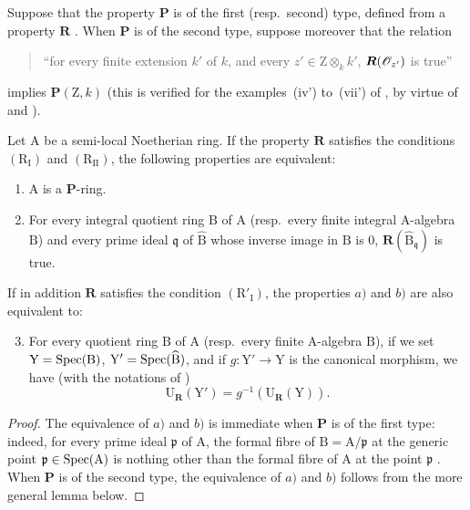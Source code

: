 \begin{proposition}[7.3.16]
\label{IV.7.3.16}
Suppose that the property $\boldsymbol{P}$ is of the first (resp.~second) type, defined from a property $\boldsymbol{R}$ .
When $\boldsymbol{P}$ is of the second type, suppose moreover that the relation
\begin{quote}
``for every finite extension $k'$ of $k$, and every $z'\in\mathrm{Z}\otimes_k k'$, $\boldsymbol{R}(\mathscr{O}_{z'})$ is true''
\end{quote}
implies $\boldsymbol{P}(\mathrm{Z},k)$ (this is verified for the examples~(iv') to~(vii') of , by virtue of  and ).

Let $\mathrm{A}$ be a semi-local Noetherian ring.
If the property $\boldsymbol{R}$ satisfies the conditions $(\mathrm{R_I})$ and $(\mathrm{R_{II}})$, the following properties are equivalent:
\begin{enumerate}[label=\emph{\alph*)}]
  \item $\mathrm{A}$ is a $\boldsymbol{P}$-ring.
  \item For every integral quotient ring $\mathrm{B}$ of $\mathrm{A}$ (resp.~every finite integral A-algebra $\mathrm{B}$) and every prime ideal $\mathfrak{q}$ of $\widehat{\mathrm{B}}$ whose inverse image in $\mathrm{B}$ is $0$, $\boldsymbol{R}(\widehat{\mathrm{B}}_\mathfrak{q})$ is true.
\end{enumerate}
If in addition $\boldsymbol{R}$ satisfies the condition $(\mathrm{R}'_\mathrm{I})$, the properties $a)$ and $b)$ are also equivalent to:
\begin{enumerate}[label=\emph{\alph*)}]
  \setcounter{enumi}{2}
  \item For every quotient ring $\mathrm{B}$ of $\mathrm{A}$ (resp.~every finite A-algebra $\mathrm{B}$), if we set $\mathrm{Y}=\operatorname{Spec}(\mathrm{B})$, $\mathrm{Y}'=\operatorname{Spec}(\widehat{\mathrm{B}})$, and if $g:\mathrm{Y}'\to\mathrm{Y}$ is the canonical morphism, we have (with the notations of )
  \[
    \mathrm{U}_{\boldsymbol{R}}(\mathrm{Y}')=g^{-1}(\mathrm{U}_{\boldsymbol{R}}(\mathrm{Y})).
    \label{IV.7.3.16.1}
\tag{7.3.16.1}
  \]
\end{enumerate}
\end{proposition}

\begin{proof}
The equivalence of $a)$ and $b)$ is immediate when $\boldsymbol{P}$ is of the first type: indeed, for every prime ideal $\mathfrak{p}$ of $\mathrm{A}$, the formal fibre of $\mathrm{B}=\mathrm{A}/\mathfrak{p}$ at the generic point $\mathfrak{p}\in\operatorname{Spec}(\mathrm{A})$ is nothing other than the formal fibre of $\mathrm{A}$ at the point $\mathfrak{p}$ .
When $\boldsymbol{P}$ is of the second type, the equivalence of $a)$ and $b)$ follows from the more general lemma below.
\end{proof}


